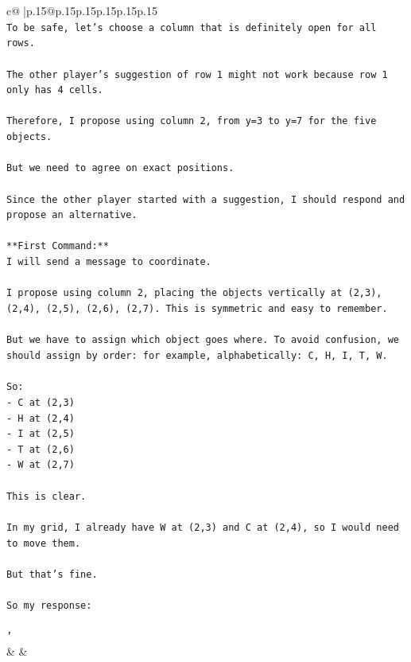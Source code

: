 \documentclass{article}
\begin{document}
{\begin{supertabular}{c@{$\;$}|p{.15\linewidth}@{}p{.15\linewidth}p{.15\linewidth}p{.15\linewidth}p{.15\linewidth}p{.15\linewidth}}
{{{\\ 
\texttt{To be safe, let's choose a column that is definitely open for all rows.} \\
\\ 
\texttt{The other player's suggestion of row 1 might not work because row 1 only has 4 cells.} \\
\\ 
\texttt{Therefore, I propose using column 2, from y=3 to y=7 for the five objects.} \\
\\ 
\texttt{But we need to agree on exact positions.} \\
\\ 
\texttt{Since the other player started with a suggestion, I should respond and propose an alternative.} \\
\\ 
\texttt{**First Command:**} \\
\texttt{I will send a message to coordinate.} \\
\\ 
\texttt{I propose using column 2, placing the objects vertically at (2,3), (2,4), (2,5), (2,6), (2,7). This is symmetric and easy to remember.} \\
\\ 
\texttt{But we have to assign which object goes where. To avoid confusion, we should assign by order: for example, alphabetically: C, H, I, T, W.} \\
\\ 
\texttt{So:} \\
\texttt{{-} C at (2,3)} \\
\texttt{{-} H at (2,4)} \\
\texttt{{-} I at (2,5)} \\
\texttt{{-} T at (2,6)} \\
\texttt{{-} W at (2,7)} \\
\\ 
\texttt{This is clear.} \\
\\ 
\texttt{In my grid, I already have W at (2,3) and C at (2,4), so I would need to move them.} \\
\\ 
\texttt{But that's fine.} \\
\\ 
\texttt{So my response:} \\
\\ 
\texttt{'} \\
            }
        }
    }
    & & \\ \\


\end{supertabular}}
\end{document}
